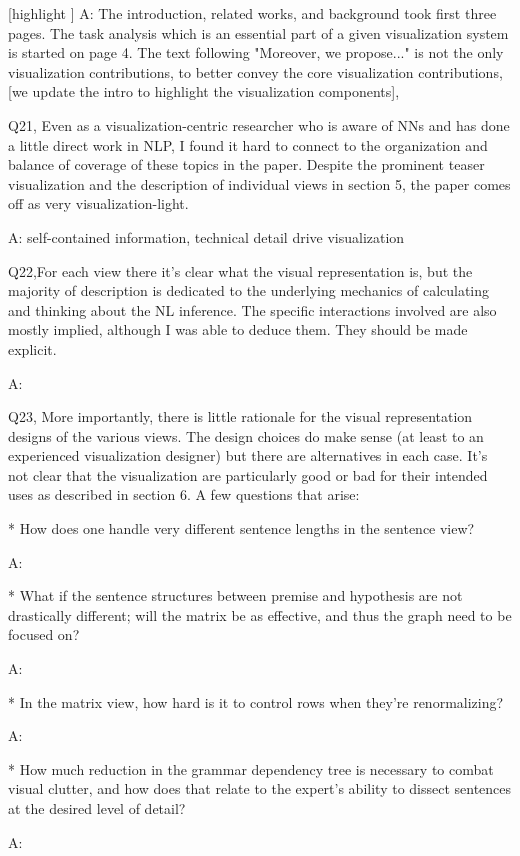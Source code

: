 [highlight ]
A: The introduction, related works, and background took first three pages. The task analysis which is an essential part of a given visualization system is started on page 4. The text following "Moreover, we propose..." is not the only visualization contributions, to better convey the core visualization contributions, [we update the intro to highlight the visualization components],

Q21, Even as a visualization-centric researcher who is aware of NNs and has done a little direct work in NLP, I found it hard to connect to the organization and balance of coverage of these topics in the paper. Despite the prominent teaser visualization and the description of individual views in section 5, the paper comes off as very visualization-light.

A: self-contained information, technical detail drive visualization

Q22,For each view there it's clear what the visual representation is, but the majority of description is dedicated to the underlying mechanics of calculating and thinking about the NL inference. The specific interactions involved are also mostly implied, although I was able to deduce them. They should be made explicit.

A:

Q23, More importantly, there is little rationale for the visual representation designs of the various views. The design choices do make sense (at least to an experienced visualization designer) but there are alternatives in each case. It's not clear that the visualization are particularly good or bad for their intended uses as described in section 6. A few questions that arise:

* How does one handle very different sentence lengths in the sentence view?

A:

* What if the sentence structures between premise and hypothesis are not drastically different; will the matrix be as effective, and thus the graph need to be focused on?

A:

* In the matrix view, how hard is it to control rows when they're renormalizing?

A:

* How much reduction in the grammar dependency tree is necessary to combat visual clutter, and how does that relate to the expert's ability to dissect sentences at the desired level of detail?

A:

